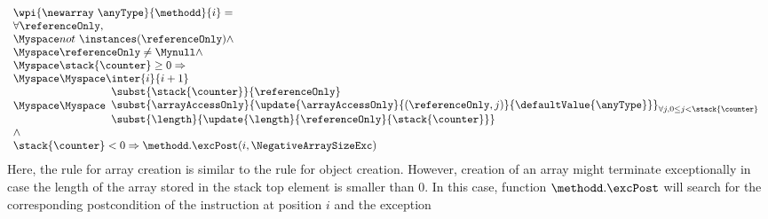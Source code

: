 \begin{itemize}
\begin{enumerate}
				 $$\begin{array}{l}
                                         \wpi{\newarray  \ \anyType } {\methodd}{i}  =  \\
			\forall \referenceOnly,\\
                        \Myspace    not \ \instances(\referenceOnly) \wedge \\
			 \Myspace \referenceOnly \neq \Mynull \wedge \\
			 	\Myspace \stack{\counter} \ge 0 \Rightarrow  \\
					 \Myspace     \Myspace  \inter{i}{i+1} \\
                                           \Myspace      \Myspace \begin{array}{l}        
						        \subst{\stack{\counter} }{ \referenceOnly } \\
							\subst{ \arrayAccessOnly }{ \update{\arrayAccessOnly}
                                                                                           {(\referenceOnly, j ) }
                                                                                         {\defaultValue{\anyType} } }_{ { \small \forall j , 0 \leq  j < \stack{\counter} } } \\
                                                          \subst{\length}{\update{\length}{\referenceOnly}{\stack{\counter} } }     
						   \end{array} \\
							\wedge \\
						\stack{\counter} < 0 \Rightarrow    \methodd.\excPost( i, \NegativeArraySizeExc) \\
                                    \end{array} $$
		  Here, the rule for array creation is similar to the rule for object creation.
		  However, creation of an array might terminate exceptionally in case the length of the array stored 
		  in the stack top element \stack{\counter} is smaller than $0$. In this case, function $\methodd.\excPost$ will search for the corresponding postcondition 
		  of the instruction at position $i$ and the exception \NegativeArraySizeExc
		

\end{enumerate}
\end{itemize}
